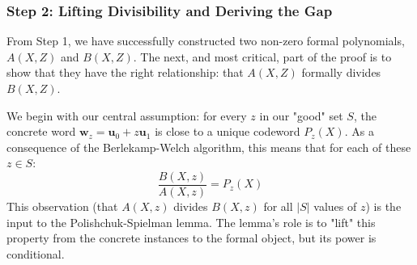 \documentclass{article}
\begin{document}









\subsubsection{Step 2: Lifting Divisibility and Deriving the Gap}
From Step 1, we have successfully constructed two non-zero formal polynomials, $A(X,Z)$ and $B(X,Z)$. The next, and most critical, part of the proof is to show that they have the right relationship: that $A(X,Z)$ formally divides $B(X,Z)$.

We begin with our central assumption: for every $z$ in our "good" set $S$, the concrete word $\mathbf{w}_z = \mathbf{u}_0 + z\mathbf{u}_1$ is close to a unique codeword $P_z(X)$. As a consequence of the Berlekamp-Welch algorithm, this means that for each of these $z \in S$:
\[ \frac{B(X,z)}{A(X,z)} = P_z(X) \]
This observation (that $A(X,z)$ divides $B(X,z)$ for all $|S|$ values of $z$) is the input to the Polishchuk-Spielman lemma. The lemma's role is to "lift" this property from the concrete instances to the formal object, but its power is conditional.
\end{document}
